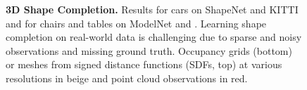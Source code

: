 \begin{figure}[t]
{\begin{subfigure}[t]{0.235\textwidth}
\begin{subfigure}[t]{0.49\textwidth}
        \end{subfigure}
    \end{subfigure}
    }
    \vspace*{-\figskipcaption px}
    \caption{{\bf 3D Shape Completion.} Results for cars on ShapeNet \citep{Chang2015ARXIV} and KITTI \citep{Geiger2012CVPR} and for chairs and tables on ModelNet \citep{Wu2015CVPR} and \Kinect \citep{Yang2018ARXIVb}. Learning shape completion on real-world data is challenging due to sparse and noisy observations and missing ground truth. Occupancy grids (bottom) or meshes from signed distance functions (SDFs, top) at various resolutions in {\color{rbeige}beige} and point cloud observations in {\color{rred}red}.}
    \label{fig:introduction}
    \vspace*{-\figskipbelow px}
\end{figure}